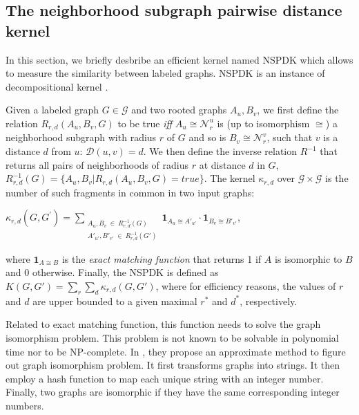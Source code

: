 \documentclass[runningheads,a4paper]{llncs}
\begin{document}
\subsection{The neighborhood subgraph pairwise distance kernel}
In this section, we briefly desbribe an efficient kernel named NSPDK \cite{nspdk} which allows to measure the similarity between labeled graphs. NSPDK is an instance of decompositional kernel \cite{convolution-kernel}.

Given a labeled graph $G \in \mathcal{G}$ and two rooted graphs $A_u, B_v$, we first define the relation $R_{r,d}(A_u, B_v, G)$ to be true {\em iff} $A_u \cong \mathcal{N}_r^u$ is (up to isomorphism $\cong$) a neighborhood subgraph with radius $r$ of $G$ and so is $B_v \cong  \mathcal{N}_r^v$, such that $v$ is a distance $d$ from $u$: $\mathcal{D}(u,v)= d$. We then define the inverse relation $R^{-1}$ that returns all pairs of neighborhoods of radius $r$ at distance $d$ in $G$, $R^{-1}_{r,d}(G) = \lbrace A_u, B_v | R_{r,d}(A_u,B_v,G)=true\rbrace$. The kernel $\kappa_{r,d}$ over $\mathcal{G} \times \mathcal{G}$ is the number of such fragments in common in two input graphs:
\begin{center}
$\kappa_{r,d}(G,G^{'}) = 
\!\!\!\!\!\!\!\!\!\!\!\! 
\sum\limits_{\substack{A_u, B_v \ \in \ R_{r,d}^{-1}(G) \\ 
{A'}_{u'}, {B'}_{v'} \ \in \ R_{r,d}^{-1}(G')
}} \!\!\!\!\!\!\!\!\!\!\!\!  { { \textbf{1}_{A_{u} \cong A'_{u'}}} \cdot {
\textbf{1}_{B_{v} \cong B'_{v'}}} }$, 
\end{center}
\noindent where $\textbf{1}_{A \cong B}$ is the \textit{exact matching function} that returns 1 if $A$ is isomorphic to $B$ and 0 otherwise. Finally, the NSPDK is defined as $K(G,G') = \sum\limits_{r}{\sum\limits_{d}{\kappa_{r,d}(G,G')}}$, where for efficiency reasons, the values of $r$ and $d$ are upper bounded to a given maximal $r^*$ and $d^*$, respectively.

Related to exact matching function, this function needs to solve the graph isomorphism problem. This problem is not known to be solvable in polynomial time nor to be NP-complete. In \cite{nspdk}, they propose an approximate method to figure out graph isomorphism problem. It first transforms graphs into strings. It then employ a hash function to map each unique string with an integer number. Finally, two graphs are isomorphic if they have the same corresponding integer numbers.
\end{document}
